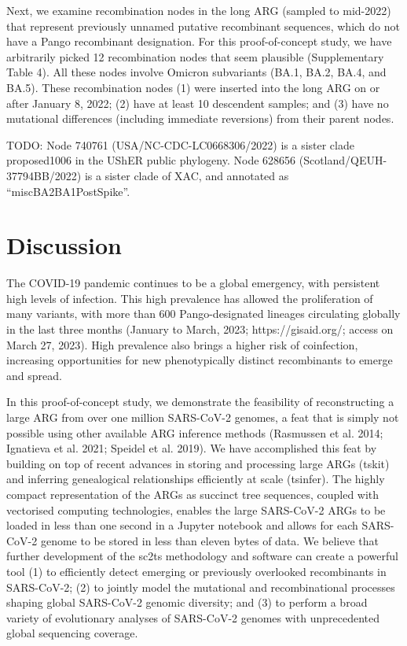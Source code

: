 \documentclass{article}
\begin{document}
Next, we examine recombination nodes in the long ARG (sampled to
mid-2022) that represent previously unnamed putative recombinant sequences,
which do not have a Pango recombinant designation. For this proof-of-concept
study, we have arbitrarily picked 12 recombination nodes that seem plausible
(Supplementary Table 4). All these nodes involve Omicron
subvariants (BA.1, BA.2, BA.4, and BA.5). These recombination nodes (1) were
inserted into the long ARG on or after January 8, 2022; (2) have at least 10
descendent samples; and (3) have no mutational differences (including immediate
reversions) from their parent nodes.

TODO: Node  740761 (USA/NC-CDC-LC0668306/2022) is a sister clade proposed1006
in the UShER public phylogeny. Node 628656 (Scotland/QEUH-37794BB/2022) is a
sister clade of XAC, and annotated as ``miscBA2BA1PostSpike''.

\section{Discussion}

The COVID-19 pandemic continues to be a global emergency, with persistent high
levels of infection. This high prevalence has allowed the proliferation of many
variants, with more than 600 Pango-designated lineages circulating globally in
the last three months (January to March, 2023; https://gisaid.org/; access on
March 27, 2023). High prevalence also brings a higher risk of coinfection,
increasing opportunities for new phenotypically distinct recombinants to emerge
and spread.

In this proof-of-concept study, we demonstrate the feasibility of
reconstructing a large ARG from over one million SARS-CoV-2 genomes, a feat
that is simply not possible using other available ARG inference methods
(Rasmussen et al. 2014; Ignatieva et al. 2021; Speidel et al. 2019). We have
accomplished this feat by building on top of recent advances in storing and
processing large ARGs (tskit) and inferring genealogical relationships
efficiently at scale (tsinfer). The highly compact representation of the ARGs
as succinct tree sequences, coupled with vectorised computing technologies,
enables the large SARS-CoV-2 ARGs to be loaded in less than one second in a
Jupyter notebook and allows for each SARS-CoV-2 genome to be stored in less
than eleven bytes of data. We believe that further development of the sc2ts
methodology and software can create a powerful tool (1) to efficiently detect
emerging or previously overlooked recombinants in SARS-CoV-2; (2) to jointly
model the mutational and recombinational processes shaping global SARS-CoV-2
genomic diversity; and (3) to perform a broad variety of evolutionary analyses
of SARS-CoV-2 genomes with unprecedented global sequencing coverage.
\end{document}
